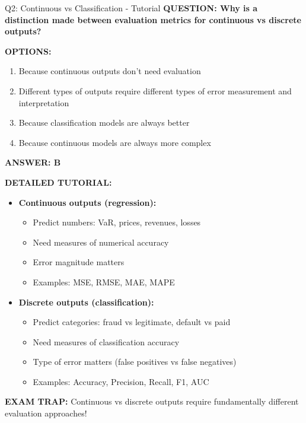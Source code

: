 \documentclass[8pt]{beamer}
\begin{document}
	\begin{frame}{Q2: Continuous vs Classification - Tutorial}
		\fontsize{6.5}{7.5}\selectfont
		\textbf{QUESTION: Why is a distinction made between evaluation metrics for continuous vs discrete outputs?}
		
		\vspace{0.1cm}
		\textbf{OPTIONS:}
		\begin{enumerate}
			\item Because continuous outputs don't need evaluation
			\item Different types of outputs require different types of error measurement and interpretation
			\item Because classification models are always better
			\item Because continuous models are always more complex
		\end{enumerate}
		
		\vspace{0.1cm}
		\textcolor{myblue}{\textbf{ANSWER: B}}
		
		\vspace{0.1cm}
		\textbf{DETAILED TUTORIAL:}
		\begin{itemize}
			\item \textbf{Continuous outputs (regression):}
			\begin{itemize}
				\item Predict numbers: VaR, prices, revenues, losses
				\item Need measures of numerical accuracy
				\item Error magnitude matters
				\item Examples: MSE, RMSE, MAE, MAPE
			\end{itemize}
			\item \textbf{Discrete outputs (classification):}
			\begin{itemize}
				\item Predict categories: fraud vs legitimate, default vs paid
				\item Need measures of classification accuracy
				\item Type of error matters (false positives vs false negatives)
				\item Examples: Accuracy, Precision, Recall, F1, AUC
			\end{itemize}
		\end{itemize}
		
		\textcolor{myred}{\textbf{EXAM TRAP:}} \textcolor{myblue}{Continuous vs discrete} outputs require fundamentally different evaluation approaches!
	\end{frame}
	
\end{document}
